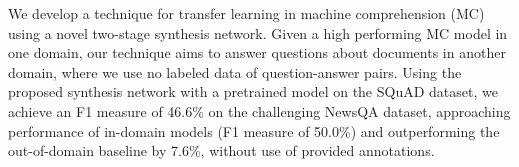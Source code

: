 We develop a technique for transfer learning in machine comprehension (MC) using a novel two-stage synthesis network.  Given a high performing MC model in one domain, our technique aims to answer questions about documents in another domain, where we use no labeled data of question-answer pairs. Using the proposed synthesis network with a pretrained model on the SQuAD dataset, we achieve an F1 measure of 46.6\% on the challenging NewsQA dataset, approaching performance of in-domain models (F1 measure of 50.0\%) and outperforming the out-of-domain baseline by 7.6\%, without use of provided annotations.
